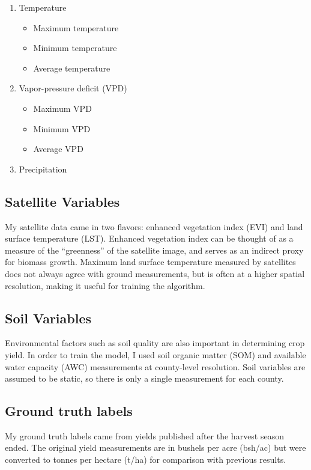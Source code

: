 \documentclass[letterpaper]{article}
\begin{document}
\begin{enumerate}
    \item Temperature
    \begin{itemize}
        \item Maximum temperature
        \item Minimum temperature
        \item Average temperature
    \end{itemize}
    \item Vapor-pressure deficit (VPD)
    \begin{itemize}
        \item Maximum VPD
        \item Minimum VPD
        \item Average VPD
    \end{itemize}
    \item Precipitation
\end{enumerate}

\subsection{Satellite Variables}

My satellite data came in two flavors: enhanced vegetation index (EVI) and land surface temperature (LST). Enhanced vegetation index can be thought of as a measure of the ``greenness'' of the satellite image, and serves as an indirect proxy for biomass growth. Maximum land surface temperature measured by satellites does not always agree with ground measurements, but is often at a higher spatial resolution, making it useful for training the algorithm.

\subsection{Soil Variables}

Environmental factors such as soil quality are also important in determining crop yield. In order to train the model, I used soil organic matter (SOM) and available water capacity (AWC) measurements at county-level resolution. Soil variables are assumed to be static, so there is only a single measurement for each county.

\subsection{Ground truth labels}

My ground truth labels came from yields published after the harvest season ended. The original yield measurements are in bushels per acre (bsh/ac) but were converted to tonnes per hectare (t/ha) for comparison with previous results.
\end{document}
